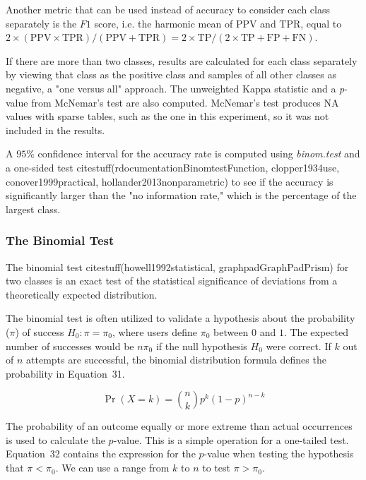 \documentclass[preprint,12pt]{elsarticle}
\begin{document}
Another metric that can be used instead of accuracy to consider each class separately is the $F1$ score, i.e. the harmonic mean of PPV and TPR, equal to $2 \times (\mathrm{PPV} \times \mathrm{TPR}) / (\mathrm{PPV} + \mathrm{TPR}) = 2 \times \mathrm{TP} / (2 \times \mathrm{TP} + \mathrm{FP} + \mathrm{FN})$.

If there are more than two classes, results are calculated for each class separately by viewing that class as the positive class and samples of all other classes as negative, a "one versus all" approach.
The unweighted Kappa statistic and a \textit{p}-value from McNemar's test are also computed. McNemar's test produces NA values with sparse tables, such as the one in this experiment, so it was not included in the results.

A $95\%$ confidence interval for the accuracy rate is computed using \textit{binom.test} and a one-sided test citestuff(rdocumentationBinomtestFunction, clopper1934use, conover1999practical, hollander2013nonparametric) to see if the accuracy is significantly larger than the "no information rate," which is the percentage of the largest class.

\subsubsection{The Binomial Test}

The binomial test citestuff(howell1992statistical, graphpadGraphPadPrism) for two classes is an exact test of the statistical significance of deviations from a theoretically expected distribution.

The binomial test is often utilized to validate a hypothesis about the probability ($\pi$) of success 
$H_{0}\colon \pi =\pi_{0}$, where users define $\pi_{0}$ between $0$ and $1$. The expected number of successes would be $n\pi_{0}$ if the null hypothesis $H_{0}$ were correct. If $k$ out of $n$ attempts are successful, the binomial distribution formula defines the probability in Equation~31.

\begin{equation}
	\Pr(X=k)={\binom{n}{k}}p^{k}(1-p)^{n-k}
	\label{eqn:31}
\end{equation}

The probability of an outcome equally or more extreme than actual occurrences is used to calculate the $p$-value. This is a simple operation for a one-tailed test. Equation~32 contains the expression for the $p$-value when testing the hypothesis that $\pi <\pi_{0}$. We can use a range from $k$ to $n$ to test $\pi >\pi_{0}$.
\end{document}

